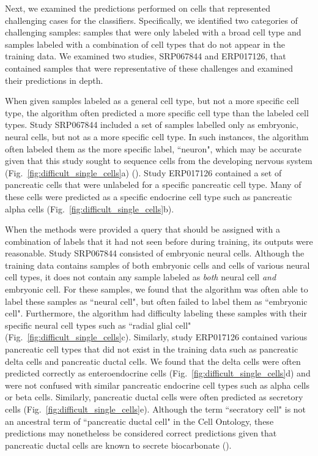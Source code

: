 Next, we examined the predictions performed on cells that represented challenging cases for the classifiers. Specifically, we identified two categories of challenging samples: samples that were only  labeled with a broad cell type and samples labeled with a combination of cell types that do not appear in the training data. We examined two studies, SRP067844 and ERP017126, that contained samples that were representative of these challenges and examined their predictions in depth.

When given samples labeled as a general cell type, but not a more specific cell type, the algorithm often predicted a more specific cell type than the labeled cell types.  Study SRP067844 included a set of samples labelled only as embryonic, neural cells, but not as a more specific cell type. In such instances, the algorithm often labeled them as the more specific label, ``neuron", which may be accurate given that this study sought to sequence cells from the developing nervous system (Fig.~\ref{fig:difficult_single_cells}a) (\citealp{Manno2016}). Study ERP017126 contained a set of pancreatic cells that were unlabeled for a specific pancreatic cell type.  Many of these cells were predicted as a specific endocrine cell type such as pancreatic alpha cells (Fig.~\ref{fig:difficult_single_cells}b).

When the methods were provided a query that should be assigned with a combination of labels that it had not seen before during training, its outputs were reasonable. Study SRP067844 consisted of embryonic neural cells. Although the training data contains samples of both embryonic cells and cells of various neural cell types, it does not contain any sample labeled as \textit{both} neural cell \textit{and} embryonic cell. For these samples, we found that the algorithm was often able to label these samples as ``neural cell", but often failed to label them as ``embryonic cell". Furthermore, the algorithm had difficulty labeling these samples with their specific neural cell types such as ``radial glial cell" (Fig.~\ref{fig:difficult_single_cells}c). Similarly, study ERP017126 contained various pancreatic cell types that did not exist in the training data such as pancreatic delta cells and pancreatic ductal cells. We found that the delta cells were often predicted correctly as enteroendocrine cells (Fig.~\ref{fig:difficult_single_cells}d) and were not confused with similar pancreatic endocrine cell types such as alpha cells or beta cells. Similarly, pancreatic ductal cells were often predicted as secretory cells (Fig.~\ref{fig:difficult_single_cells}e). Although the term ``secratory cell" is not an ancestral term of ``pancreatic ductal cell" in the Cell Ontology, these predictions may nonetheless be considered correct predictions given that pancreatic ductal cells are known to secrete biocarbonate (\citealp{Grapin-Botton2005}). 
  
